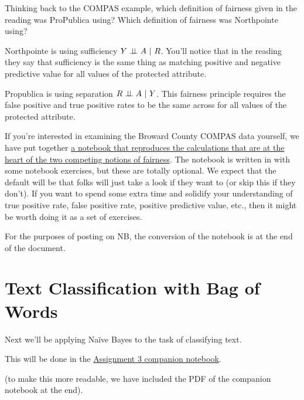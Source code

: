 \documentclass[assignment03_Solutions]{subfiles}
\begin{document}
\begin{exercise}[(10 minutes)]
Thinking back to the COMPAS example, which definition of fairness given in the reading was ProPublica using?  Which definition of fairness was Northpointe using?

\begin{boxedsolution}
\bi
\item Northpointe is using sufficiency $Y \perp\!\!\!\perp A~|~R$.  You'll notice that in the reading they say that sufficiency is the same thing as matching positive and negative predictive value for all values of the protected attribute.
\item Propublica is using separation $R \perp\!\!\!\perp A~|~Y$.  This fairness principle requires the false positive and true positive rates to be the same across for all values of the protected attribute.
\ei
\end{boxedsolution}
\end{exercise}

If you're interested in examining the Broward County COMPAS data yourself, we have put together \href{https://colab.research.google.com/github/mlfa19/assignments/blob/master/Module\%202/03/Exploring_COMPAS_Data.ipynb}{a notebook that reproduces the calculations that are at the heart of the two competing notions of fairness}.  The notebook is written in with some notebook exercises, but these are totally optional.  We expect that the default will be that folks will just take a look if they want to (or skip this if they don't). If you want to spend some extra time and solidify your understanding of true positive rate, false positive rate, positive predictive value, etc., then it might be worth doing it as a set of exercises.

For the purposes of posting on NB, the conversion of the notebook is at the end of the document.

\section{Text Classification with Bag of Words}
Next we'll be applying Na\"ive Bayes to the task of classifying text.

\begin{externalresources}[(60 minutes)]
This will be done in the \href{https://colab.research.google.com/github/mlfa19/assignments/blob/master/Module\%202/03/Assignment_3_Companion_Notebook.ipynb}{Assignment 3 companion notebook}.
\end{externalresources}

(to make this more readable, we have included the PDF of the companion notebook at the end).



\end{document}
